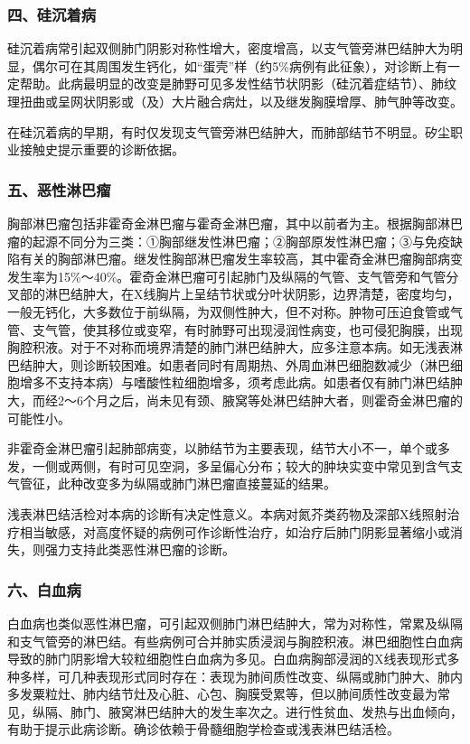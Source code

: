 \subsubsection{四、硅沉着病}

硅沉着病常引起双侧肺门阴影对称性增大，密度增高，以支气管旁淋巴结肿大为明显，偶尔可在其周围发生钙化，如“蛋壳”样（约5\%病例有此征象），对诊断上有一定帮助。此病最明显的改变是肺野可见多发性结节状阴影（硅沉着症结节）、肺纹理扭曲或呈网状阴影或（及）大片融合病灶，以及继发胸膜增厚、肺气肿等改变。

在硅沉着病的早期，有时仅发现支气管旁淋巴结肿大，而肺部结节不明显。矽尘职业接触史提示重要的诊断依据。

\subsubsection{五、恶性淋巴瘤}

胸部淋巴瘤包括非霍奇金淋巴瘤与霍奇金淋巴瘤，其中以前者为主。根据胸部淋巴瘤的起源不同分为三类：①胸部继发性淋巴瘤；②胸部原发性淋巴瘤；③与免疫缺陷有关的胸部淋巴瘤。继发性胸部淋巴瘤发生率较高，其中霍奇金淋巴瘤胸部病变发生率为15\%～40\%。霍奇金淋巴瘤可引起肺门及纵隔的气管、支气管旁和气管分叉部的淋巴结肿大，在X线胸片上呈结节状或分叶状阴影，边界清楚，密度均匀，一般无钙化，大多数位于前纵隔，为双侧性肿大，但不对称。肿物可压迫食管或气管、支气管，使其移位或变窄，有时肺野可出现浸润性病变，也可侵犯胸膜，出现胸腔积液。对于不对称而境界清楚的肺门淋巴结肿大，应多注意本病。如无浅表淋巴结肿大，则诊断较困难。如患者同时有周期热、外周血淋巴细胞数减少（淋巴细胞增多不支持本病）与嗜酸性粒细胞增多，须考虑此病。如患者仅有肺门淋巴结肿大，而经2～6个月之后，尚未见有颈、腋窝等处淋巴结肿大者，则霍奇金淋巴瘤的可能性小。

非霍奇金淋巴瘤引起肺部病变，以肺结节为主要表现，结节大小不一，单个或多发，一侧或两侧，有时可见空洞，多呈偏心分布；较大的肿块实变中常见到含气支气管征，此种改变多为纵隔或肺门淋巴瘤直接蔓延的结果。

浅表淋巴结活检对本病的诊断有决定性意义。本病对氮芥类药物及深部X线照射治疗相当敏感，对高度怀疑的病例可作诊断性治疗，如治疗后肺门阴影显著缩小或消失，则强力支持此类恶性淋巴瘤的诊断。

\subsubsection{六、白血病}

白血病也类似恶性淋巴瘤，可引起双侧肺门淋巴结肿大，常为对称性，常累及纵隔和支气管旁的淋巴结。有些病例可合并肺实质浸润与胸腔积液。淋巴细胞性白血病导致的肺门阴影增大较粒细胞性白血病为多见。白血病胸部浸润的X线表现形式多种多样，可几种表现形式同时存在：表现为肺间质性改变、纵隔或肺门肿大、肺内多发粟粒灶、肺内结节灶及心脏、心包、胸膜受累等，但以肺间质性改变最为常见，纵隔、肺门、腋窝淋巴结肿大的发生率次之。进行性贫血、发热与出血倾向，有助于提示此病诊断。确诊依赖于骨髓细胞学检查或浅表淋巴结活检。

